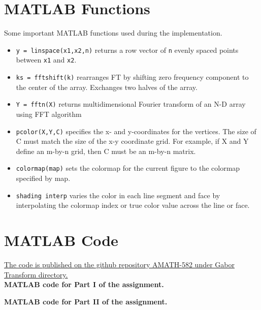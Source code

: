 \documentclass{article}
\begin{document}
\pagebreak
\begin{appendices}

\section{MATLAB Functions}
Some important MATLAB functions used during the implementation.
\begin{itemize}
    \item \texttt{y = linspace(x1,x2,n)} returns a row vector of \texttt{n} evenly spaced points between \texttt{x1} and \texttt{x2}. 
    \item \texttt{ks = fftshift(k)} rearranges FT by shifting zero frequency component to the center of the array. Exchanges two halves of the array.
    \item \texttt{Y = fftn(X)} returns multidimensional Fourier transform of an N-D array using FFT algorithm
    \item \texttt{pcolor(X,Y,C)} specifies the x- and y-coordinates for the vertices. The size of C must match the size of the x-y coordinate grid. For example, if X and Y define an m-by-n grid, then C must be an m-by-n matrix.
    \item \texttt{colormap(map)} sets the colormap for the current figure to the colormap specified by map.
    \item \texttt{shading interp} varies the color in each line segment and face by interpolating the colormap index or true color value across the line or face.
\end{itemize}

\pagebreak

\section{MATLAB Code}
\href{https://github.com/cssubedi/AMATH-582}{The code is published on the github repository AMATH-582 under Gabor Transform directory.} \\

\textbf{MATLAB code for Part I of the assignment.}

\pagebreak
\textbf{MATLAB code for Part II of the assignment.}



\end{appendices}
\end{document}
